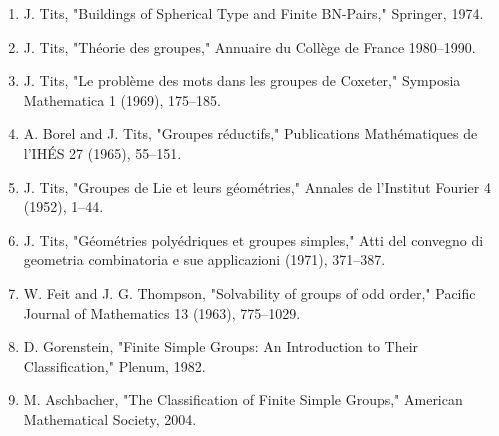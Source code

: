 \begin{enumerate}
\item J. Tits, "Buildings of Spherical Type and Finite BN-Pairs," Springer, 1974.
\item J. Tits, "Th\'eorie des groupes," Annuaire du Coll\`ege de France 1980--1990.
\item J. Tits, "Le probl\`eme des mots dans les groupes de Coxeter," Symposia Mathematica 1 (1969), 175--185.
\item A. Borel and J. Tits, "Groupes r\'eductifs," Publications Math\'ematiques de l'IH\'ES 27 (1965), 55--151.
\item J. Tits, "Groupes de Lie et leurs g\'eom\'etries," Annales de l'Institut Fourier 4 (1952), 1--44.
\item J. Tits, "G\'eom\'etries poly\'edriques et groupes simples," Atti del convegno di geometria combinatoria e sue applicazioni (1971), 371--387.
\item W. Feit and J. G. Thompson, "Solvability of groups of odd order," Pacific Journal of Mathematics 13 (1963), 775--1029.
\item D. Gorenstein, "Finite Simple Groups: An Introduction to Their Classification," Plenum, 1982.
\item M. Aschbacher, "The Classification of Finite Simple Groups," American Mathematical Society, 2004.
\end{enumerate}
